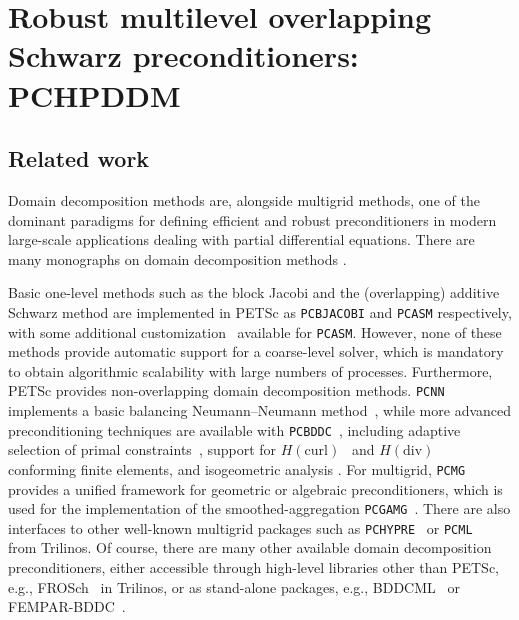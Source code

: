 \documentclass[3p,11pt]{elsarticle}
\newcommand{\pk}[1]{\texttt{#1}}
\begin{document}
\section{Robust multilevel overlapping Schwarz preconditioners: PCHPDDM}\label{sec:PCHPDDM}
  \subsection{Related work}
Domain decomposition methods are, alongside multigrid methods, one of the
dominant paradigms for defining efficient and robust preconditioners in
modern large-scale applications dealing with partial differential equations.
There are many monographs on domain decomposition methods \cite{smith2004domain,dolean2014ddm,toselli2005domain,pechstein2012finite,quarteroni1999domain,mathew2008domain}.

Basic one-level methods such as the block Jacobi and the (overlapping) additive Schwarz method are implemented
in PETSc as \pk{PCBJACOBI} and \pk{PCASM} respectively, with some additional customization~\cite{cai1999restricted}
available for \pk{PCASM}. However, none of these methods provide automatic support for a coarse-level solver,
which is mandatory to obtain algorithmic scalability with large numbers of processes.
Furthermore, PETSc provides non-overlapping domain decomposition methods. \pk{PCNN} implements a basic balancing Neumann--Neumann
method~\cite{mandel1993balancing}, while more advanced preconditioning
techniques are available with \pk{PCBDDC}~\cite{zampini2016pcbddc}, including
adaptive selection of primal constraints~\cite{pechstein2017unified}, support
for $H(\text{curl})$~\cite{zampini2017balancing} and
$H(\text{div})$~\cite{oh2018bddc} conforming finite elements, and isogeometric
analysis \cite{da2014isogeometric}.
For multigrid,
\pk{PCMG} provides a unified framework for geometric or algebraic preconditioners, which is used for the implementation of the smoothed-aggregation
\pk{PCGAMG}~\cite{adams2004ultra}. There are also interfaces to other well-known
multigrid packages such as \pk{PCHYPRE}~\cite{falgout2002hypre} or \pk{PCML}~\cite{gee2006ml} from Trilinos. Of
course, there are many other available domain decomposition preconditioners,
either accessible through high-level libraries other than PETSc, e.g., FROSch~\cite{Heinlein:2016:PIT} in
Trilinos, or as stand-alone packages, e.g., BDDCML~\cite{vsistek2013parallel} or
FEMPAR-BDDC~\cite{badia2014highly}.
\end{document}
